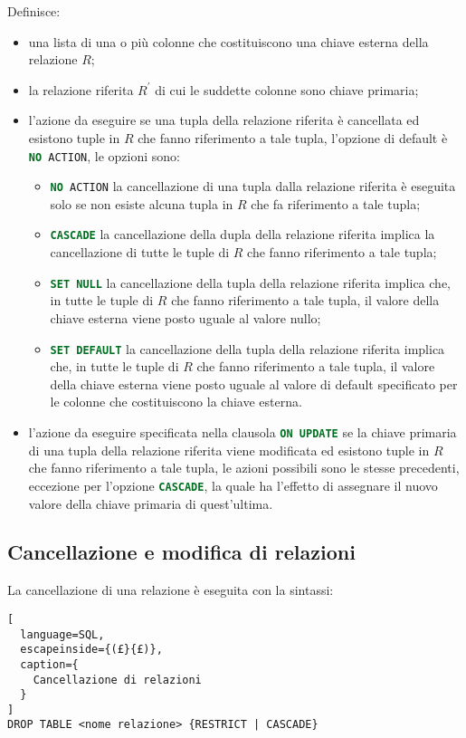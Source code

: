 Definisce:
\begin{itemize}
  \item una lista di una o più colonne che costituiscono una chiave esterna
    della relazione $R$;
  \item la relazione riferita $R^\prime$ di cui le suddette colonne sono chiave
    primaria;
  \item l'azione da eseguire se una tupla della relazione riferita è cancellata
    ed esistono tuple in $R$ che fanno riferimento a tale tupla, l'opzione di
    default è \lstinline[language=SQL]{NO ACTION}, le opzioni sono:
    \begin{itemize}
      \item \lstinline[language=SQL]{NO ACTION} la cancellazione di una tupla
        dalla relazione riferita è eseguita solo se non esiste alcuna tupla in
        $R$ che fa riferimento a tale tupla;
      \item \lstinline[language=SQL]{CASCADE} la cancellazione della dupla della
        relazione riferita implica la cancellazione di tutte le tuple di $R$ che
        fanno riferimento a tale tupla;
      \item \lstinline[language=SQL]{SET NULL} la cancellazione della tupla
        della relazione riferita implica che, in tutte le tuple di $R$ che fanno
        riferimento a tale tupla, il valore della chiave esterna viene posto
        uguale al valore nullo;
      \item \lstinline[language=SQL]{SET DEFAULT} la cancellazione della tupla
        della relazione riferita implica che, in tutte le tuple di $R$ che fanno
        riferimento a tale tupla, il valore della chiave esterna viene posto
        uguale al valore di default specificato per le colonne che costituiscono
        la chiave esterna.
    \end{itemize}
  \item l'azione da eseguire specificata nella clausola
    \lstinline[language=SQL]{ON UPDATE} se la chiave primaria di una tupla della
    relazione riferita viene modificata ed esistono tuple in $R$ che fanno
    riferimento a tale tupla, le azioni possibili sono le stesse precedenti,
    eccezione per l'opzione \lstinline[language=SQL]{CASCADE}, la quale ha
    l'effetto di assegnare il nuovo valore della chiave primaria di
    quest'ultima.
\end{itemize}

\subsection{Cancellazione e modifica di relazioni}%
\label{sub:Cancellazione e modifica di relazioni}
La cancellazione di una relazione è eseguita con la sintassi:
\begin{lstlisting}[
  language=SQL,
  escapeinside={(£}{£)},
  caption={
    Cancellazione di relazioni
  }
]
DROP TABLE <nome relazione> {RESTRICT | CASCADE}
\end{lstlisting}

